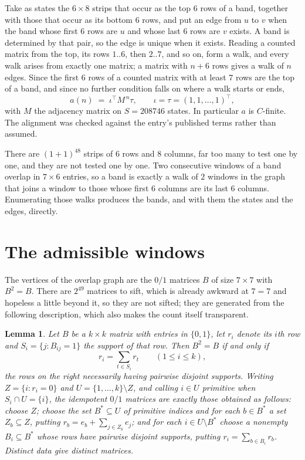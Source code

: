 \documentclass[11pt,a4paper]{article}
\theoremstyle{plain}
\newtheorem{lemma}[theorem]{Lemma}
\theoremstyle{definition}
\begin{document}
Take as states the $6\times8$ strips that occur as the top $6$ rows of a band,
together with those that occur as its bottom $6$ rows, and put an edge from $u$ to $v$
when the band whose first $6$ rows are $u$ and whose last $6$ rows are $v$ exists.
A band is determined by that pair, so the edge is unique when it exists. Reading a counted
matrix from the top, its rows $1..6$, then $2..7$, and so on, form a walk, and every
walk arises from exactly one matrix; a matrix with $n+6$ rows gives a walk of $n$ edges.
Since the first $6$ rows of a counted matrix with at least $7$ rows are the top of a
band, and since no further condition falls on where a walk starts or ends,
\[
a(n)\;=\;\iota^{\!\top}M^{\,n}\tau ,\qquad \iota=\tau=(1,1,\dots,1)^{\!\top},
\]
with $M$ the adjacency matrix on $S=208746$ states. In particular $a$ is $C$-finite. The
alignment was checked against the entry's published terms rather than assumed.

There are $(1 + 1)^{48}$ strips of $6$ rows and $8$ columns, far too
many to test one by one, and they are not tested one by one. Two consecutive windows of a band
overlap in $7\times6$ entries, so a band is exactly a walk of $2$ windows in
the graph that joins a window to those whose first $6$ columns are its last $6$
columns. Enumerating those walks produces the bands, and with them the states and the edges,
directly.

\section{The admissible windows}

The vertices of the overlap graph are the $0/1$ matrices $B$ of size $7\times7$ with
$B^2=B$. There are $2^{49}$ matrices to sift, which is already awkward at $7=7$ and
hopeless a little beyond it, so they are not sifted; they are generated from the following
description, which also makes the count itself transparent.

\begin{lemma}\label{lem:idem}
Let $B$ be a $k\times k$ matrix with entries in $\{0,1\}$, let $r_i$ denote its $i$th row and
$S_i=\{j:B_{ij}=1\}$ the support of that row. Then $B^2=B$ if and only if
\[
r_i=\sum_{t\in S_i}r_t \qquad (1\le i\le k),
\]
the rows on the right necessarily having pairwise disjoint supports. Writing
$Z=\{i:r_i=0\}$ and $U=\{1,\dots,k\}\setminus Z$, and calling $i\in U$ \emph{primitive}
when $S_i\cap U=\{i\}$, the idempotent $0/1$ matrices are exactly those obtained as follows:
choose $Z$; choose the set $B^{\ast}\subseteq U$ of primitive indices and for each
$b\in B^{\ast}$ a set $Z_b\subseteq Z$, putting $r_b=e_b+\sum_{j\in Z_b}e_j$; and for each
$i\in U\setminus B^{\ast}$ choose a nonempty $B_i\subseteq B^{\ast}$ whose rows have
pairwise disjoint supports, putting $r_i=\sum_{b\in B_i}r_b$. Distinct data give distinct
matrices.
\end{lemma}
\end{document}
